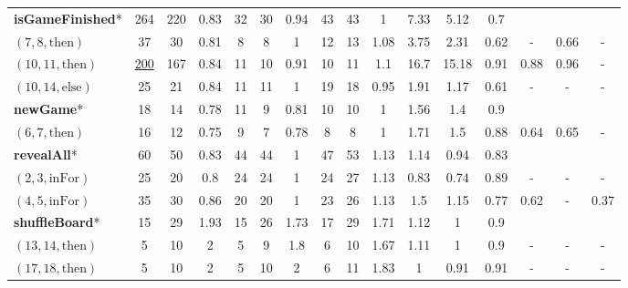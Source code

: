 \documentclass[sigconf,review,anonymous]{acmart}
\newcommand{\thenBr}{\text{then}}
\newcommand{\elseBr}{\text{else}}
\newcommand{\inFor}{\text{inFor}}
\newcommand{\un}[1]{\underline{#1}}
\begin{document}
\begin{table}[!t]
\begin{tabular}{l|ccc|ccc|ccc|ccc|ccc}
    \hline                                                                                                          
    \textbf{isGameFinished}* & 264      & 220  & 0.83      & 32 & 30 & 0.94             & 43 & 43 & 1                  & 7.33 & 5.12  & 0.7    &      &      &        \\
    $(7,8,\thenBr)$          & 37       & 30   & 0.81      & 8  & 8  & 1                & 12 & 13 & 1.08               & 3.75 & 2.31  & 0.62   & -  & 0.66 & -   \\
    $(10,11,\thenBr)$        & \un{200} & 167  & 0.84      & 11 & 10 & 0.91             & 10 & 11 & 1.1                & 16.7 & 15.18 & 0.91   & 0.88 & 0.96 & -   \\
    $(10,14,\elseBr)$        & 25       & 21   & 0.84      & 11 & 11 & 1                & 19 & 18 & 0.95               & 1.91 & 1.17  & 0.61   & - & - & -   \\
    \hline
    \textbf{newGame}*   
                             & 18       & 14   & 0.78      & 11 & 9  & 0.81             & 10 & 10 & 1                  & 1.56 & 1.4   & 0.9    &      &      &      \\
    $(6,7,\thenBr)$          & 16       & 12   & 0.75      & 9  & 7  & 0.78             & 8  & 8  & 1                  & 1.71 & 1.5   & 0.88   & 0.64 & 0.65 & -  \\
    \hline
    \textbf{revealAll}*  
                             & 60       & 50   & 0.83      & 44 & 44 & 1                & 47 & 53 & 1.13               & 1.14 & 0.94  & 0.83   &      &      &        \\
    $(2,3,\inFor)$           & 25       & 20   & 0.8       & 24 & 24 & 1                & 24 & 27 & 1.13               & 0.83 & 0.74  & 0.89   & - & - & -  \\
    $(4,5,\inFor)$           & 35       & 30   & 0.86      & 20 & 20 & 1                & 23 & 26 & 1.13               & 1.5  & 1.15  & 0.77   & 0.62 & -   &  0.37  \\
    \hline
    \textbf{shuffleBoard}*   
                             & 15       & 29   & 1.93      & 15 & 26 & 1.73             & 17 & 29 & 1.71               & 1.12 & 1     & 0.9    &      &      &       \\
    $(13,14,\thenBr)$        & 5        & 10   & 2         & 5  & 9  & 1.8              & 6  & 10 & 1.67               & 1.11 & 1     & 0.9    & - & - & -  \\
    $(17,18,\thenBr)$        & 5        & 10   & 2         & 5  & 10 & 2                & 6  & 11 & 1.83               & 1    & 0.91  & 0.91   & - & - & -   \\

\end{tabular}
\end{table}
\end{document}

